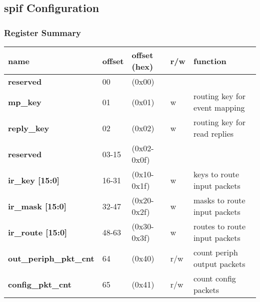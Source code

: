 \documentclass[11pt,a4paper,twoside]{article}
\begin{document}
\clearpage
\subsection{spif Configuration}


\subsubsection*{Register Summary}

\begin{center}
\begin{table}[!h]
	\begin{tabularx}{\textwidth}{| p{34mm} p{13mm} p{21mm} p{7mm} X |}
		\hline
		\textbf{name} & \textbf{offset} & \textbf{offset} (hex) & \textbf{r/w} & \textbf{function} \\%
		\hline
		\hline
		\cellcolor{gray!25}\textbf{reserved} & \cellcolor{gray!25}00      & \cellcolor{gray!25}(0x00)      & \cellcolor{gray!25} & \cellcolor{gray!25}\\%
		\textbf{mp\_key}                     & 01                         & (0x01)                         & w                   & routing key for event mapping \\%
		\textbf{reply\_key}                  & 02                         & (0x02)                         & w                   & routing key for read replies \\%
		\cellcolor{gray!25}\textbf{reserved} & \cellcolor{gray!25}03-15   & \cellcolor{gray!25}(0x02-0x0f) & \cellcolor{gray!25} & \cellcolor{gray!25}\\%
		\textbf{ir\_key [15:0]}              & 16-31                      & (0x10-0x1f)                    & w                   & keys to route input packets \\%
		\textbf{ir\_mask [15:0]}             & 32-47                      & (0x20-0x2f)                    & w                   & masks to route input packets \\%
		\textbf{ir\_route [15:0]}            & 48-63                      & (0x30-0x3f)                    & w                   & routes to route input packets \\%
		\textbf{out\_periph\_pkt\_cnt}       & 64                         & (0x40)                         & r/w                 & count periph output packets\\%
		\textbf{config\_pkt\_cnt}            & 65                         & (0x41)                         & r/w                 & count config packets \\%

\end{tabularx}
\end{table}
\end{center}
\end{document}
